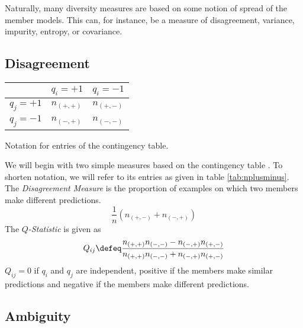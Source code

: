 \documentclass[../main.tex]{subfiles}
\begin{document}

Naturally, many diversity measures are based on some notion of spread of the member models. This can, for instance, be a measure of disagreement, variance, impurity, entropy, or covariance.

\subsection{Disagreement}
\begin{margintable}
    \centering
    \begin{tabular}{|l|l|l|}
    \hline
         & $q_i = +1$ & $q_i = -1$ \\ \hline
        $q_j = +1$ & $n_{(+,+)}$ & $n_{(+,-)}$ \\ \hline
        $q_j = -1$ & $n_{(-,+)}$ & $n_{(-,-)}$ \\ \hline
    \end{tabular}
    \label{tab:nplusminus}
    \caption{Notation for entries of the contingency table.}
\end{margintable}
We will begin with two simple measures based on the contingency table \cite{zhou}. To shorten notation, we will refer to its entries as given in table \ref{tab:nplusminus}.
The \textit{Disagreement Measure} is the proportion of examples on which two members make different predictions.
$$
\frac{1}{n} (n_{(+,-)} + n_{(-,+)})
$$
The \textit{$Q$-Statistic} is given as
$$
Q_{ij}\defeq \frac{n_{(+,+)} n_{(-,-)} - n_{(-,+)} n_{(+,-)}}{n_{(+,+)} n_{(-,-)} + n_{(-,+)} n_{(+,-)}}
$$
$Q_{ij} = 0$ if $q_{i}$ and $q_{j}$ are independent, positive if the members make similar predictions and negative if the members make different predictions.

\subsection{Ambiguity}
\end{document}
